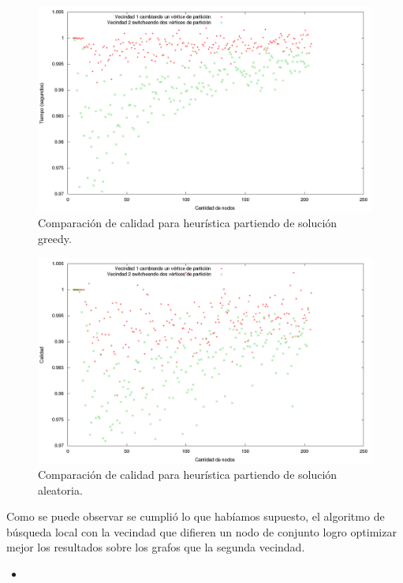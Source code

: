 \begin{figure}[H]
\begin{center}
\includegraphics[scale=0.4]{./img/CalidadGreedyLocal.png}
\caption{Comparación de calidad para heurística partiendo de solución greedy.}
\end{center}
\end{figure}

\begin{figure}[H]
\begin{center}
\includegraphics[scale=0.4]{./img/CalidadAleatorioLocal.png}
\caption{Comparación de calidad para heurística partiendo de solución aleatoria.}
\end{center}
\end{figure}

Como se puede observar se cumplió lo que habíamos supuesto, el algoritmo de búsqueda local con la vecindad que difieren un nodo de conjunto logro optimizar mejor los resultados sobre los grafos que la segunda vecindad.


\begin{itemize}
\item
\end{itemize}